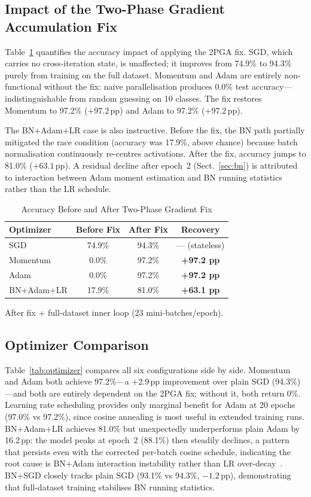 \documentclass[runningheads]{llncs}
\begin{document}
\subsection{Impact of the Two-Phase Gradient Accumulation Fix}

Table~\ref{tab:bugfix} quantifies the accuracy impact of applying the 2PGA
fix. SGD, which carries no cross-iteration state, is unaffected; it
improves from 74.9\% to 94.3\% purely from training on the full dataset.
Momentum and Adam are entirely non-functional without the fix: naive
parallelisation produces 0.0\% test accuracy—indistinguishable from random
guessing on 10 classes. The fix restores Momentum to 97.2\% ($+97.2$\,pp)
and Adam to 97.2\% ($+97.2$\,pp).

The BN+Adam+LR case is also instructive. Before the fix, the BN path
partially mitigated the race condition (accuracy was 17.9\%, above chance)
because batch normalisation continuously re-centres activations. After the
fix, accuracy jumps to 81.0\% ($+63.1$\,pp). A residual decline after
epoch~2 (Sect.~\ref{sec:bn}) is attributed to interaction between Adam
moment estimation and BN running statistics rather than the LR schedule.

\begin{table}[htb]
\caption{Accuracy Before and After Two-Phase Gradient Fix}
\label{tab:bugfix}
\centering
\begin{tabular}{lccc}
\toprule
\textbf{Optimizer} & \textbf{Before Fix} & \textbf{After Fix}
  & \textbf{Recovery}\\
\midrule
SGD        & 74.9\% & 94.3\% & — (stateless)     \\
Momentum   &  0.0\% & 97.2\% & \textbf{+97.2 pp} \\
Adam       &  0.0\% & 97.2\% & \textbf{+97.2 pp} \\
BN+Adam+LR & 17.9\% & 81.0\% & \textbf{+63.1 pp} \\
\bottomrule
\end{tabular}

\smallskip
{\footnotesize After fix + full-dataset inner loop (23 mini-batches/epoch).}
\end{table}

\subsection{Optimizer Comparison}

Table~\ref{tab:optimizer} compares all six configurations side by side.
Momentum and Adam both achieve 97.2\%—a $+2.9$\,pp improvement over plain
SGD (94.3\%)—and both are entirely dependent on the 2PGA fix; without it,
both return 0\%. Learning rate scheduling provides only marginal benefit
for Adam at 20 epochs (97.0\% vs 97.2\%), since cosine annealing is most
useful in extended training runs. BN+Adam+LR achieves 81.0\% but
unexpectedly underperforms plain Adam by 16.2\,pp: the model peaks at
epoch~2 (88.1\%) then steadily declines, a pattern that persists even with
the corrected per-batch cosine schedule, indicating the root cause is
BN+Adam interaction instability rather than LR over-decay~\cite{b8}.
BN+SGD closely tracks plain SGD (93.1\% vs 94.3\%, $-1.2$\,pp),
demonstrating that full-dataset training stabilises BN running statistics.
\end{document}
